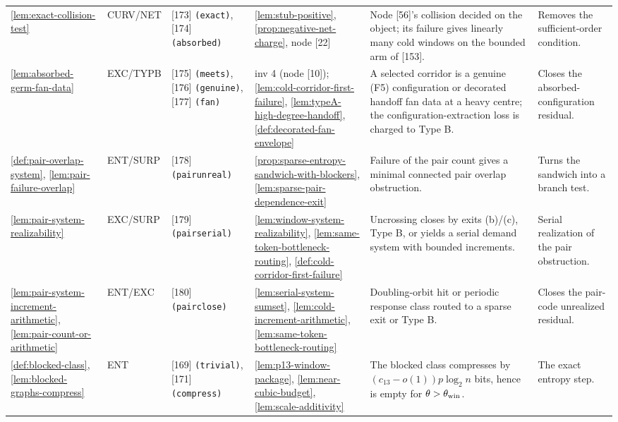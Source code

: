 \documentclass[11pt]{article}
\begin{document}
{\begin{longtable}{L{0.10\textwidth} C{0.045\textwidth} L{0.13\textwidth} L{0.135\textwidth} L{0.28\textwidth} L{0.20\textwidth}}
\cref{lem:exact-collision-test} & CURV\slash NET & [173] \texttt{(exact)}, [174] \texttt{(absorbed)} & \cref{lem:stub-positive}, \cref{prop:negative-net-charge}, node [22] & Node [56]'s collision decided on the object; its failure gives linearly many cold windows on the bounded arm of [153]. & Removes the sufficient-order condition. \\
\cref{lem:absorbed-germ-fan-data} & EXC\slash TYPB & [175] \texttt{(meets)}, [176] \texttt{(genuine)}, [177] \texttt{(fan)} & inv 4 (node [10]); \cref{lem:cold-corridor-first-failure}, \cref{lem:typeA-high-degree-handoff}, \cref{def:decorated-fan-envelope} & A selected corridor is a genuine (F5) configuration or decorated handoff fan data at a heavy centre; the configuration-extraction loss is charged to Type B. & Closes the absorbed-configuration residual. \\
\cref{def:pair-overlap-system}, \cref{lem:pair-failure-overlap} & ENT\slash SURP & [178] \texttt{(pairunreal)} & \cref{prop:sparse-entropy-sandwich-with-blockers}, \cref{lem:sparse-pair-dependence-exit} & Failure of the pair count gives a minimal connected pair overlap obstruction. & Turns the sandwich into a branch test. \\
\cref{lem:pair-system-realizability} & EXC\slash SURP & [179] \texttt{(pairserial)} & \cref{lem:window-system-realizability}, \cref{lem:same-token-bottleneck-routing}, \cref{def:cold-corridor-first-failure} & Uncrossing closes by exits (b)/(c), Type B, or yields a serial demand system with bounded increments. & Serial realization of the pair obstruction. \\
\cref{lem:pair-system-increment-arithmetic}, \cref{lem:pair-count-or-arithmetic} & ENT\slash EXC & [180] \texttt{(pairclose)} & \cref{lem:serial-system-sumset}, \cref{lem:cold-increment-arithmetic}, \cref{lem:same-token-bottleneck-routing} & Doubling-orbit hit or periodic response class routed to a sparse exit or Type B. & Closes the pair-code unrealized residual. \\
\cref{def:blocked-class}, \cref{lem:blocked-graphs-compress} & ENT & [169] \texttt{(trivial)}, [171] \texttt{(compress)} & \cref{lem:p13-window-package}, \cref{lem:near-cubic-budget}, \cref{lem:scale-additivity} & The blocked class compresses by \((c_{13}-o(1))p\log_2 n\) bits, hence is empty for \(\theta>\theta_{\rm win}\). & The exact entropy step. \\

\end{longtable}}
\end{document}
